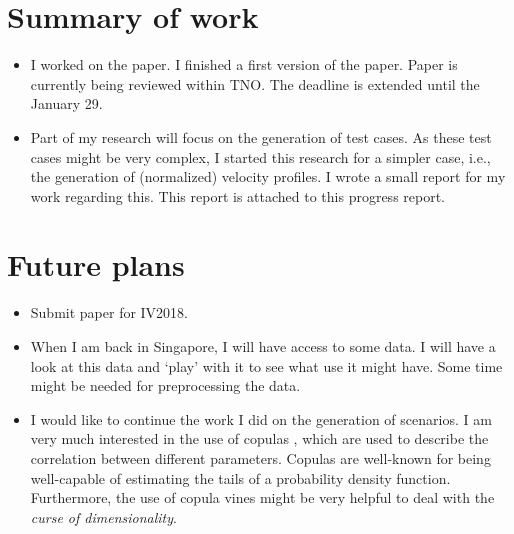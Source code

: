 \documentclass[10pt,final,a4paper,oneside,onecolumn]{article}
\begin{document}
\section{Summary of work}
\begin{itemize}
	\item I worked on the paper. I finished a first version of the paper. Paper is currently being reviewed within TNO. The deadline is extended until the January 29.
	\item Part of my research will focus on the generation of test cases. As these test cases might be very complex, I started this research for a simpler case, i.e., the generation of (normalized) velocity profiles. I wrote a small report for my work regarding this. This report is attached to this progress report.
\end{itemize}

\section{Future plans}
\begin{itemize}
	\item Submit paper for IV2018.
	\item When I am back in Singapore, I will have access to some data. I will have a look at this data and `play' with it to see what use it might have. Some time might be needed for preprocessing the data.
	\item I would like to continue the work I did on the generation of scenarios. I am very much interested in the use of copulas \cite{Schmidt2007, scaillet2007estimationcopulas}, which are used to describe the correlation between different parameters. Copulas are well-known for being well-capable of estimating the tails of a probability density function. Furthermore, the use of copula vines \cite{aas2009paircopula, czado2010paircopula} might be very helpful to deal with the \emph{curse of dimensionality}.
\end{itemize}
\end{document}
